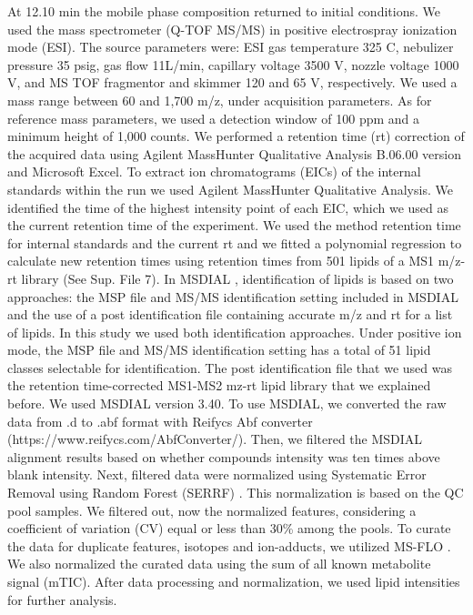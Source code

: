 \documentclass[9pt,twocolumn,twoside,lineno]{BioRxiv}
\begin{document}
At 12.10 min the mobile phase composition returned to initial conditions.
We used the mass spectrometer (Q-TOF MS/MS) in positive electrospray ionization mode (ESI).
The source parameters were: ESI gas temperature 325 \degree C, nebulizer pressure 35 psig, gas flow 11L/min, capillary voltage 3500 V, nozzle voltage 1000 V, and MS TOF fragmentor and skimmer 120 and 65 V, respectively.
We used a mass range between 60 and 1,700 m/z, under acquisition parameters. 
As for reference mass parameters, we used a detection window of 100 ppm and a minimum height of 1,000 counts. 
We performed a retention time (rt) correction of the acquired data using Agilent MassHunter Qualitative Analysis B.06.00 version and Microsoft Excel. 
To extract ion chromatograms (EICs) of the internal standards within the run we used Agilent MassHunter Qualitative Analysis.
We identified the time of the highest intensity point of each EIC, which we used as the current retention time of the experiment. 
We used the method retention time for internal standards and the current rt and we fitted a polynomial regression to calculate new retention times using retention times from 501 lipids of a MS1 m/z-rt library (See Sup. File 7). 
In MSDIAL \cite{Tsugawa2015-kh}, identification of lipids is based on two approaches: the MSP file and MS/MS identification setting included in MSDIAL and the use of a post identification file containing accurate m/z and rt for a list of lipids. 
In this study we used both identification approaches. 
Under positive ion mode, the MSP file and MS/MS identification setting has a total of 51 lipid classes  selectable for identification. 
The post identification file that we used was the retention time-corrected MS1-MS2 mz-rt lipid library that we explained before. 
We used MSDIAL \cite{Tsugawa2015-kh} version 3.40. 
To use MSDIAL, we converted the raw data from .d to .abf format with Reifycs Abf converter (https://www.reifycs.com/AbfConverter/). 
Then, we filtered the MSDIAL alignment results based on whether compounds intensity was ten times above blank intensity. Next, filtered data were normalized using Systematic Error Removal using Random Forest (SERRF) \cite{Fan2019}. This normalization is based on the QC pool samples. 
We filtered out, now the normalized features, considering a coefficient of variation (CV) equal or less than 30\% among the pools. 
To curate the data for duplicate features, isotopes and ion-adducts, we utilized MS-FLO \cite{DeFelice2017-ms}.
We also normalized the curated data using the sum of all known metabolite signal (mTIC). 
After data processing and normalization, we used lipid intensities for further analysis.
\end{document}
